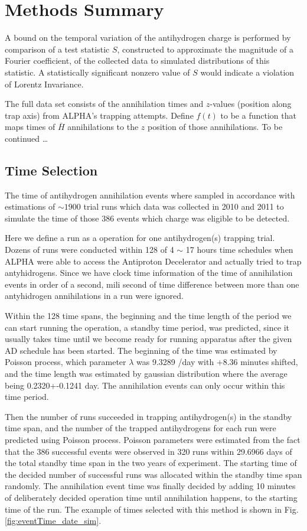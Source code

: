 \documentclass[superscriptaddress,aps,prb,11pt]{revtex4-1}
\begin{document}
\section{Methods Summary}
A bound on the temporal variation of the antihydrogen charge is performed by comparison of a test statistic $S$, constructed to approximate the magnitude of a Fourier coefficient, of the collected data to simulated distributions of this statistic.  A statistically significant nonzero value of $S$ would indicate a violation of Lorentz Invariance.

The full data set consists of the annihilation times and $z$-values (position along trap axis) from ALPHA's trapping attempts.  Define $f(t)$ to be a function that maps times of $\bar{H}$ annihilations to the $z$ position of those annihilations.  To be continued \ldots

\subsection*{Time Selection}
 The time of antihydrogen annihilation events where sampled in accordance with estimations of $\sim 1900$  trial runs which data was collected in 2010 and 2011 to simulate the time of those 386 events which charge was eligible to be detected.
 
 Here we define a run as a operation for one antihydrogen(s) trapping trial. Dozens of runs were conducted within 128 of 4 $\sim$ 17 hours time schedules when ALPHA were able to access the Antiproton Decelerator and actually tried to trap antyhidrogens. Since we have clock time information of the time of annihilation events in order of a second, mili second of time difference between more than one antyhidrogen annihilations  in a run were ignored.
 
 Within the 128 time spans, the beginning and the time length of the period we can start running the operation, a standby time period, was predicted, since it usually takes time until we become ready for running apparatus after the given AD schedule has been started. The beginning of the time was estimated by Poisson process, which parameter $\lambda$ was 9.3289 /day  with +8.36 minutes shifted, and the time length was estimated by gaussian distribution where the average being 0.2320+-0.1241 day. The annihilation events can only occur within this time period. 
 
 Then the number of runs succeeded in trapping antihydrogen(s) in the standby time span, and the number of the trapped antihydrogens for each run were predicted using Poisson process. Poisson parameters were estimated from the fact that the 386 successful events were observed in 320 runs within 29.6966 days of the total standby time span in the two years of experiment. 
The starting time of the decided number of  successful runs was allocated within the standby time span randomly. The annihilation event time was finally decided by adding 10 minutes of deliberately decided operation time until annihilation happens, to the starting time of the run. The example of times selected with this method is shown in Fig.\ref{fig:eventTime_date_sim}.
 
\end{document}
